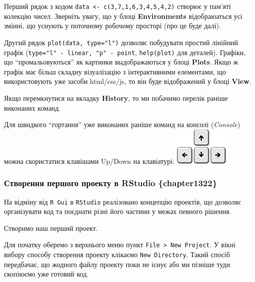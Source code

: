 \documentclass[
]{book}
\begin{document}
Перший рядок з кодом \texttt{data\ \textless{}-\ c(3,7,1,6,3,4,5,4,2)} створює у пам'яті колекцію чисел. Зверніть увагу, що у блоці \textbf{Environments} відобраюаться усі змінні, що уснують у поточному робочому просторі (про це буде далі).

Другий рядок \texttt{plot(data,\ type="l")} дозволяє побудувати простий лінійний графік (\texttt{type="l"\ -\ linear,\ "p"\ -\ point}, \texttt{help(plot)} для деталей). Графіки, що ``промальовуються'' як картинки выдображаються у блоці \textbf{Plots}. Якщо ж графік має більш складну візуалізацію з інтерактивними елементами, що використовують уже засоби html/css/js, то він буде відображений у блоці \textbf{View}.

Якщо перемкнутися на вкладку \textbf{History}, то ми побачимо перелік раніше виконаних команд.

Для швидкого ``гортання'' уже виконаних раніше команд на консолі (\emph{Console}) можна скористатися клавішами Up/Down на клавіатурі:
\includegraphics{images/chapter1/arrow_keys.png}

\hypertarget{ux441ux442ux432ux43eux440ux435ux43dux43dux44f-ux43fux435ux440ux448ux43eux433ux43e-ux43fux440ux43eux435ux43aux442ux443-ux432-rstudio-chapter1322}{%
\subsubsection{Створення першого проекту в RStudio \{chapter1322\}}\label{ux441ux442ux432ux43eux440ux435ux43dux43dux44f-ux43fux435ux440ux448ux43eux433ux43e-ux43fux440ux43eux435ux43aux442ux443-ux432-rstudio-chapter1322}}

На відміну від \texttt{R\ Gui} в \texttt{RStudio} реалізовано концепцію проектів, що дозволяє організувати код та поєднати різні його частини у межах певного рішення.

Створимо наш перший проект.

Для початку оберемо з верхнього меню пункт \texttt{File\ \textgreater{}\ New\ Project}. У вікні вибору способу створення проекту клікаємо \texttt{New\ Directory}. Такий спосіб передбачає, що жодного файлу проекту поки не існує або ми пізніше туди скопіюємо уже готовий код.
\end{document}

